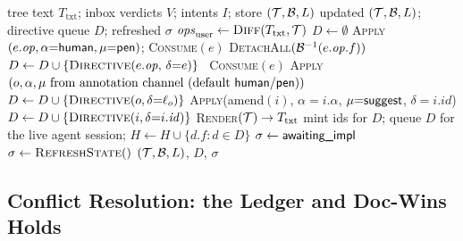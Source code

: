 \begin{algorithm}[t]
\caption{Loop B --- tree $\to$ code realization (one pass)}
\label{alg:loop-b}
\begin{algorithmic}[1]
\Require tree text $T_{\mathrm{txt}}$; inbox verdicts $V$; intents $I$; store $(\mathcal{T}, \mathcal{B}, L)$
\Ensure updated $(\mathcal{T}, \mathcal{B}, L)$; directive queue $D$; refreshed $\sigma$
\State $\mathit{ops}_{\mathrm{user}} \gets \textsc{Diff}(T_{\mathrm{txt}}, \mathcal{T})$  \label{line:snapshot}
\State $D \gets \emptyset$
 
        \State \textsc{Apply}$(e.\mathit{op}, \alpha{=}\textsf{human}, \mu{=}\textsf{pen})$; \textsc{Consume}$(e)$
         \label{line:retire}
            \State \textsc{DetachAll}$(\mathcal{B}^{-1}(e.\mathit{op}.f))$ 
         $D \gets D \cup \{\textsc{Directive}(e.\mathit{op},\, \delta{=}e)\}$
        \EndIf
    \Else\ \textsc{Consume}$(e)$ 
    \EndIf
\EndFor
{} 
    \State \textsc{Apply}$(o, \alpha, \mu \text{ from annotation channel (default \textsf{human}/\textsf{pen})})$
     $D \gets D \cup \{\textsc{Directive}(o, \delta{=}\ell_o)\}$ \label{line:imperative}
    \EndIf
\EndFor
{} 
    \State \textsc{Apply}(\textsf{amend}$(i)$, $\alpha{=}i.\alpha$, $\mu{=}\textsf{suggest}$, $\delta{=}i.\mathit{id}$)
     $D \gets D \cup \{\textsc{Directive}(i, \delta{=}i.\mathit{id})\}$
    \EndIf
\EndFor
{} \textsc{Render}$(\mathcal{T}) \to T_{\mathrm{txt}}$  \label{line:rerender}
\EndIf
{}
    \State mint ids for $D$; queue $D$ for the live agent session; $H \gets H \cup \{d.f : d \in D\}$
    \State $\sigma \gets \textsf{awaiting\_impl}$ 
\Else
    \State $\sigma \gets \textsc{RefreshState}()$
\EndIf
\State \Return $(\mathcal{T}, \mathcal{B}, L)$, $D$, $\sigma$
\end{algorithmic}
\end{algorithm}

\subsection{Conflict Resolution: the Ledger and Doc-Wins Holds}
\label{sec:conflicts}

